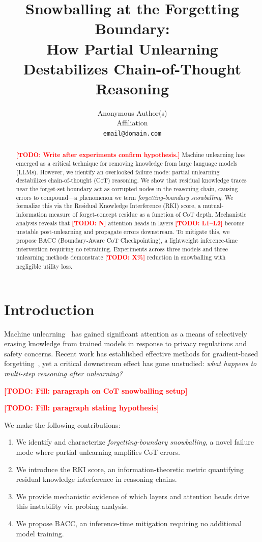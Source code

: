 \documentclass[letterpaper]{article}
\title{Snowballing at the Forgetting Boundary: \\
How Partial Unlearning Destabilizes Chain-of-Thought Reasoning}
\author{
  Anonymous Author(s) \\
  Affiliation \\
  \texttt{email@domain.com}
}
\newcommand{\rki}{\textsc{RKI}}
\newcommand{\bacc}{\textsc{BACC}}
\newcommand{\TODO}[1]{\textcolor{red}{\textbf{[TODO: #1]}}}
\begin{document}
\maketitle

\begin{abstract}
\TODO{Write after experiments confirm hypothesis.}
Machine unlearning has emerged as a critical technique for removing knowledge from
large language models (LLMs). However, we identify an overlooked failure mode:
partial unlearning destabilizes chain-of-thought (CoT) reasoning. We show that
residual knowledge traces near the forget-set boundary act as corrupted nodes
in the reasoning chain, causing errors to compound---a phenomenon we term
\textit{forgetting-boundary snowballing}. We formalize this via the
Residual Knowledge Interference (\rki) score, a mutual-information measure
of forget-concept residue as a function of CoT depth. Mechanistic analysis
reveals that \TODO{N} attention heads in layers \TODO{L1--L2} become unstable
post-unlearning and propagate errors downstream. To mitigate this, we propose
\bacc{} (Boundary-Aware CoT Checkpointing), a lightweight inference-time
intervention requiring no retraining. Experiments across three models and three
unlearning methods demonstrate \TODO{X\%} reduction in snowballing with
negligible utility loss.
\end{abstract}

\section{Introduction}
\label{sec:intro}

Machine unlearning~\cite{cao2015towards} has gained significant attention as a
means of selectively erasing knowledge from trained models in response to privacy
regulations and safety concerns. Recent work has established effective methods
for gradient-based forgetting~\cite{chundawat2023bad,zhang2024npo}, yet a critical
downstream effect has gone unstudied: \textit{what happens to multi-step reasoning
after unlearning?}

\TODO{Fill: paragraph on CoT snowballing setup}

\TODO{Fill: paragraph stating hypothesis}

We make the following contributions:
\begin{enumerate}
    \item We identify and characterize \textit{forgetting-boundary snowballing},
    a novel failure mode where partial unlearning amplifies CoT errors.
    \item We introduce the \rki{} score, an information-theoretic metric
    quantifying residual knowledge interference in reasoning chains.
    \item We provide mechanistic evidence of which layers and attention heads
    drive this instability via probing analysis.
    \item We propose \bacc{}, an inference-time mitigation requiring no
    additional model training.
\end{enumerate}
\end{document}
